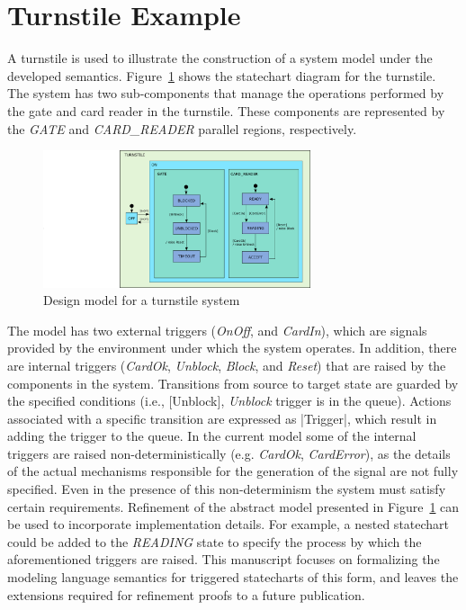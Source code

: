 \section{Turnstile Example}
\label{sec:example}

A turnstile is used to illustrate the construction of a system model under the developed semantics. 
Figure~\ref{fig:turnstile} shows the statechart diagram for the turnstile. The system has two sub-components that manage the operations performed by the gate and card reader in the turnstile. These components are represented by the \emph{GATE} and \emph{CARD\_READER} parallel regions, respectively. 
\begin{figure}[!th]
\centering
\includegraphics[trim={25cm 0 0 0}, width=0.7\textwidth]{figures/Turnstile.png}
\caption{Design model for a turnstile system}
\label{fig:turnstile}
\end{figure}

The model has two external triggers (\emph{OnOff}, and \emph{CardIn}), which are signals provided by the environment under which the system operates. In addition, there are internal triggers (\emph{CardOk}, \emph{Unblock}, \emph{Block}, and \emph{Reset}) that are raised by the components in the system. Transitions from source to target state are guarded by the specified conditions (i.e., [Unblock], \emph{Unblock} trigger is in the queue). Actions associated with a specific transition are expressed as 
|\raise Trigger|, which result in adding the trigger to the queue. In the current model some of the internal triggers are raised non-deterministically (e.g. \emph{CardOk}, \emph{CardError}), as the details of the actual mechanisms responsible for the generation of the signal are not fully specified. Even in the presence of this non-determinism the system must satisfy certain requirements. 
Refinement of the abstract model presented in Figure~\ref{fig:turnstile} can be used to incorporate implementation details. 
For example, a nested  statechart could be added to the \emph{READING} state to specify the process by which the aforementioned triggers are  raised. 
This manuscript focuses on formalizing the modeling language semantics for triggered statecharts of this form, and leaves the extensions required for refinement proofs to a future publication.  
